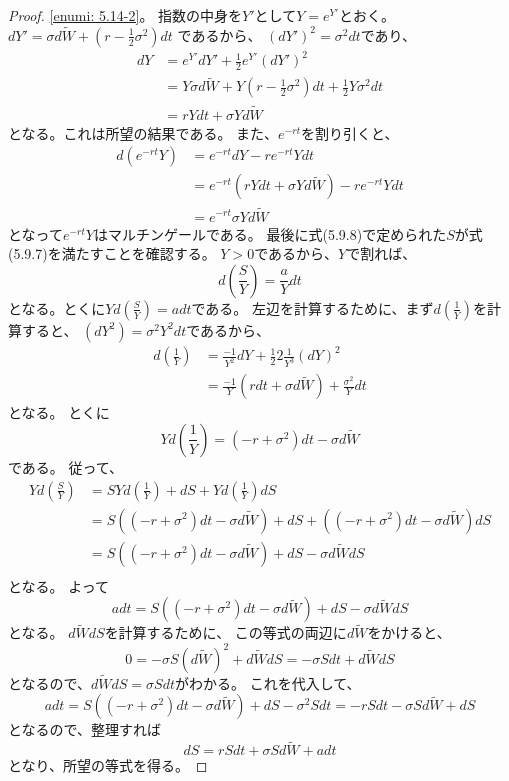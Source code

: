 \documentclass[uplatex]{jsarticle}
\theoremstyle{definition}
\begin{document}
\begin{proof}
  \ref{enumi: 5.14-2}。
  指数の中身を\(Y'\)として\(Y=e^{Y'}\)とおく。
  \(dY' = \sigma d\tilde{W} + \left( r-\frac{1}{2}\sigma^2 \right)dt\)
  であるから、
  \((dY')^2 = \sigma^2 dt\)であり、
  \begin{align*}
    dY
    &= e^{Y'}dY' + \frac{1}{2}e^{Y'}(dY')^2 \\
    &= Y\sigma d\tilde{W}
    + Y\left( r-\frac{1}{2}\sigma^2 \right)dt
    + \frac{1}{2}Y\sigma^2dt \\
    &= rY dt + \sigma Yd\tilde{W}
  \end{align*}
  となる。これは所望の結果である。
  また、\(e^{-rt}\)を割り引くと、
  \begin{align*}
    d(e^{-rt}Y)
    &= e^{-rt}dY - re^{-rt}Ydt \\
    &= e^{-rt}\left( rY dt + \sigma Yd\tilde{W} \right) - re^{-rt}Ydt \\
    &= e^{-rt}\sigma Yd\tilde{W}
  \end{align*}
  となって\(e^{-rt}Y\)はマルチンゲールである。
  最後に式(5.9.8)で定められた\(S\)が式(5.9.7)を満たすことを確認する。
  \(Y > 0\)であるから、\(Y\)で割れば、
  \[
  d\left( \frac{S}{Y}\right) = \frac{a}{Y}dt
  \]
  となる。とくに\(Yd\left( \frac{S}{Y}\right) = adt\)である。
  左辺を計算するために、まず\(d\left( \frac{1}{Y}\right)\)を計算すると、
  \((dY^2) = \sigma^2Y^2dt\)であるから、
  \begin{align*}
    d\left( \frac{1}{Y} \right)
    &= \frac{-1}{Y^2}dY + \frac{1}{2} 2\frac{1}{Y^3} (dY)^2 \\
    &= \frac{-1}{Y}\left( rdt + \sigma d\tilde{W} \right)
    + \frac{\sigma^2}{Y} dt
  \end{align*}
  となる。
  とくに
  \[
  Yd\left( \frac{1}{Y}\right)
  = (-r + \sigma^2) dt - \sigma d\tilde{W}
  \]
  である。
  従って、
  \begin{align*}
    Yd\left( \frac{S}{Y} \right)
    &= SYd\left( \frac{1}{Y} \right) + dS +
    Yd\left( \frac{1}{Y} \right)dS \\
    &= S\left( (-r + \sigma^2) dt - \sigma d\tilde{W} \right)
    + dS
    + \left( (-r + \sigma^2) dt - \sigma d\tilde{W} \right) dS \\
    &= S\left( (-r + \sigma^2) dt - \sigma d\tilde{W} \right)
    + dS - \sigma d\tilde{W}dS \\
  \end{align*}
  となる。
  よって
  \[
  adt =
  S\left( (-r + \sigma^2) dt - \sigma d\tilde{W} \right)
  + dS - \sigma d\tilde{W}dS
  \]
  となる。
  \(d\tilde{W}dS\)を計算するために、
  この等式の両辺に\(d\tilde{W}\)をかけると、
  \[
  0 = - \sigma S (d\tilde{W})^2 + d\tilde{W}dS
  = - \sigma S dt + d\tilde{W}dS
  \]
  となるので、\(d\tilde{W}dS = \sigma S dt\)がわかる。
  これを代入して、
  \[
  adt =
  S\left( (-r + \sigma^2) dt - \sigma d\tilde{W} \right)
  + dS - \sigma ^2 S dt
  = -rS dt - \sigma Sd\tilde{W} + dS
  \]
  となるので、整理すれば
  \[
  dS = rSdt + \sigma S d\tilde{W} + adt
  \]
  となり、所望の等式を得る。


\end{proof}
\end{document}
